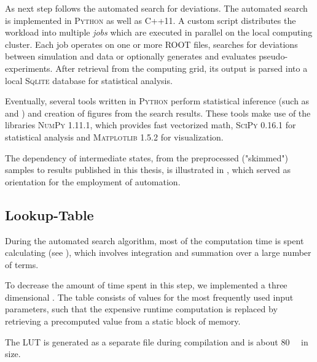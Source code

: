 As next step follows the automated search for deviations. The automated search is implemented in \textsc{Python} as well as C++11. A custom script distributes the workload into multiple \emph{jobs} which are executed in parallel on the local computing cluster. Each job operates on one or more \textsc{ROOT} files, searches for deviations between simulation and data or optionally generates and evaluates pseudo-experiments.
After retrieval from the computing grid, its output is parsed into a local \textsc{Sqlite} database for statistical analysis.

Eventually, several tools written in \textsc{Python} perform statistical inference (such as \ptilde and \phat) and creation of figures from the search results. These tools make use of the libraries \textsc{NumPy} 1.11.1\cite{Walt:NumPyarraystructure}, which provides fast vectorized math, \textsc{SciPy} 0.16.1\cite{Jones:SciPyOpensource} for statistical analysis and \textsc{Matplotlib} 1.5.2\cite{Hunter:Matplotlib2Dgraphics} for visualization.

The dependency of intermediate states, from the preprocessed ("skimmed") samples to results published in this thesis, is illustrated in , which served as orientation for the employment of automation.

\subsection{Lookup-Table}
During the automated search algorithm, most of the computation time is spent calculating \TS (see ), which involves integration and summation over a large number of terms.

To decrease the amount of time spent in this step, we implemented a three dimensional . The table consists of \TS values for the most frequently used input parameters, such that the expensive runtime computation is replaced by retrieving a precomputed value from a static block of memory.

The \ac{LUT} is generated as a separate file during compilation and is about \SI{80}{\mega\byte} in size.

